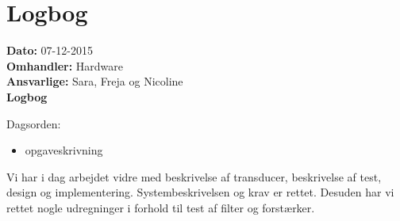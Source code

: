 \section{Logbog}

\textbf{Dato:} 07-12-2015 \\
\textbf{Omhandler:} Hardware \\
\textbf{Ansvarlige:} Sara, Freja og Nicoline \\
\textbf{Logbog}

Dagsorden:
\begin{itemize}
	\item opgaveskrivning
	
\end{itemize}
Vi har i dag arbejdet vidre med beskrivelse af transducer, beskrivelse af test, design og implementering. Systembeskrivelsen og krav er rettet. Desuden har vi rettet nogle udregninger i forhold til test af filter og forstærker.